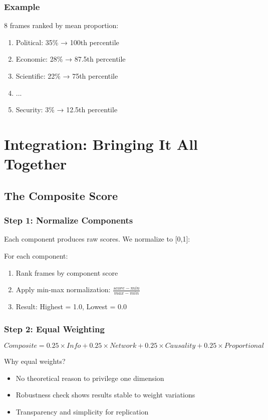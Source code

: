 \documentclass[11pt]{article}
\begin{document}
\subsubsection{Example}
8 frames ranked by mean proportion:
\begin{enumerate}
    \item Political: 35\% → 100th percentile
    \item Economic: 28\% → 87.5th percentile
    \item Scientific: 22\% → 75th percentile
    \item ...
    \item Security: 3\% → 12.5th percentile
\end{enumerate}

\section{Integration: Bringing It All Together}

\subsection{The Composite Score}

\subsubsection{Step 1: Normalize Components}

Each component produces raw scores. We normalize to [0,1]:

\begin{tcolorbox}[mybox={Normalization Procedure}]
For each component:
\begin{enumerate}
    \item Rank frames by component score
    \item Apply min-max normalization: $\frac{score - min}{max - min}$
    \item Result: Highest = 1.0, Lowest = 0.0
\end{enumerate}
\end{tcolorbox}

\subsubsection{Step 2: Equal Weighting}

\[Composite = 0.25 \times Info + 0.25 \times Network + 0.25 \times Causality + 0.25 \times Proportional\]

Why equal weights?
\begin{itemize}
    \item No theoretical reason to privilege one dimension
    \item Robustness check shows results stable to weight variations
    \item Transparency and simplicity for replication
\end{itemize}
\end{document}
